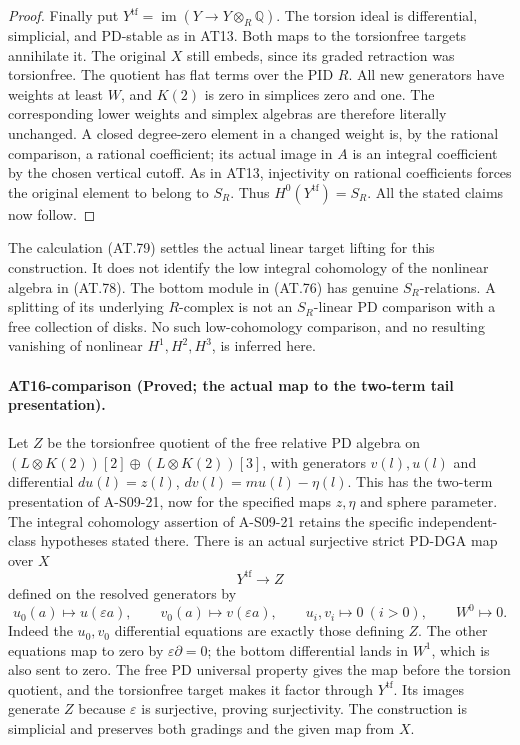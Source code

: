 \begin{proof}
Finally put $Y^{\mathrm{tf}}=\operatorname{im}
(Y\to Y\otimes_R\mathbb Q)$.
The torsion ideal is differential, simplicial,
and PD-stable as in AT13.
Both maps to the torsionfree targets annihilate it.
The original $X$ still embeds, since its graded
retraction was torsionfree.
The quotient has flat terms over the PID $R$.
All new generators have weights at least $W$,
and $K(2)$ is zero in simplices zero and one.
The corresponding lower weights and simplex
algebras are therefore literally unchanged.
A closed degree-zero element in a changed weight
is, by the rational comparison, a rational
coefficient; its actual image in $A$ is an
integral coefficient by the chosen vertical cutoff.
As in AT13, injectivity on rational coefficients
forces the original element to belong to $S_R$.
Thus $H^0(Y^{\mathrm{tf}})=S_R$.
All the stated claims now follow.
\end{proof}

The calculation \textup{(AT.79)} settles the actual
linear target lifting for this construction.
It does not identify the low integral cohomology
of the nonlinear algebra in \textup{(AT.78)}.
The bottom module in \textup{(AT.76)} has genuine
$S_R$-relations. A splitting of its underlying
$R$-complex is not an $S_R$-linear PD comparison
with a free collection of disks.
No such low-cohomology comparison, and no resulting vanishing
of nonlinear $H^1,H^2,H^3$, is inferred here.

\paragraph{AT16-comparison (Proved; the actual map to the two-term tail presentation).}
Let $Z$ be the torsionfree quotient of the free
relative PD algebra on
$(L\otimes K(2))[2]\oplus(L\otimes K(2))[3]$,
with generators $v(l),u(l)$ and differential
$du(l)=z(l)$, $dv(l)=mu(l)-\eta(l)$.
This has the two-term presentation of A-S09-21,
now for the specified maps $z,\eta$ and sphere parameter.
The integral cohomology assertion of A-S09-21 retains
the specific independent-class hypotheses stated there.
There is an actual surjective strict PD-DGA map
over $X$
\[
                 Y^{\mathrm{tf}}\longrightarrow Z
 \tag{AT.81}
\]
defined on the resolved generators by
\[
 u_0(a)\longmapsto u(\varepsilon a),\qquad
 v_0(a)\longmapsto v(\varepsilon a),\qquad
 u_i,v_i\longmapsto0\ (i>0),\qquad W^0\longmapsto0.
 \tag{AT.82}
\]
Indeed the $u_0,v_0$ differential equations are
exactly those defining $Z$. The other equations
map to zero by $\varepsilon\partial=0$;
the bottom differential lands in $W^1$, which
is also sent to zero.
The free PD universal property gives the map
before the torsion quotient, and the torsionfree
target makes it factor through $Y^{\mathrm{tf}}$.
Its images generate $Z$ because $\varepsilon$
is surjective, proving surjectivity.
The construction is simplicial and preserves
both gradings and the given map from $X$.


